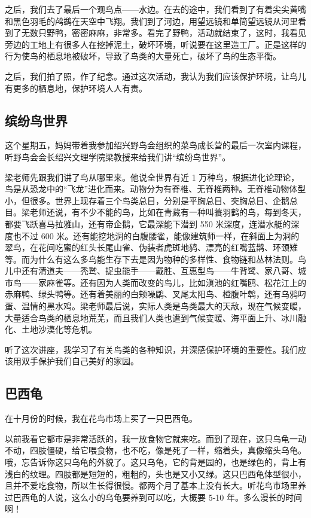 \documentclass[UTF8,a4paper,titlepage,twoside,10.5pt]{article}
\begin{document}
之后，我们去了最后一个观鸟点——水边。在去的途中，我们看到了有着尖尖黄嘴和黑色羽毛的鸬鹚在天空中飞翔。我们到了河边，用望远镜和单筒望远镜从河里看到了无数只野鸭，密密麻麻，非常多。看完了野鸭，活动就结束了，这时，我看见旁边的工地上有很多人在挖掉泥土，破坏环境，听说要在这里造工厂。正是这样的行为使鸟的栖息地被破坏，导致了鸟类的大量死亡，破坏了鸟的生态平衡。

之后，我们拍了照，作了纪念。通过这次活动，我认为我们应该保护环境，让鸟儿有更多的栖息地，保护环境人人有责。

\subsection{缤纷鸟世界}
\label{sec:org7ec663f}

这个星期五，妈妈带着我参加绍兴野鸟会组织的菜鸟成长营的最后一次室内课程，听野鸟会会长绍兴文理学院梁教授来给我们讲“缤纷鸟世界”。

梁老师先跟我们讲了鸟从哪里来。他说全世界有近 1 万种鸟，根据进化论理论，鸟是从恐龙中的“飞龙”进化而来。动物分为有脊椎、无脊椎两种。无脊椎动物体型小，但很多。世界上现存着三个鸟类总目，分别是平胸总目、突胸总目、企鹅总目。梁老师还说，有不少不能的鸟，比如在青藏有一种叫蓑羽鹤的鸟，每到冬天，都要飞跃喜马拉雅山，还有帝企鹅，它最深能下潜到 550 米深度，连潜水艇的深度也不过 600 米。还有能挖地洞的白腹腰雀，能像建筑师一样，在斜面上为洞的翠鸟，在花间吃蜜的红头长尾山雀、伪装者虎斑地鸫、漂亮的红嘴蓝鹊、环颈雉等。而为什么有这么多鸟能生存下去是因为物种的多样性、食物链和丛林法则。鸟儿中还有清道夫——秃鹫、捉虫能手——戴胜、互惠型鸟——牛背鹭、家八哥、城市鸟——家麻雀等。还有因为人类而改变的鸟儿，比如滇池的红嘴鸥、松花江上的赤麻鸭、绿头鸭等。还有着美丽的白颊噪鹛、叉尾太阳鸟、橙腹叶鹎，还有乌鸦叼蛋、温情的黑水鸡。梁老师最后说，实际人类是鸟类最大的天敌，现在气候变暖，大量适合鸟类的栖息地荒芜，而且我们人类也遭到气候变暖、海平面上升、冰川融化、土地沙漠化等危机。

听了这次讲座，我学习了有关鸟类的各种知识，并深感保护环境的重要性。我们应该用双手保护我们自己美好的家园。

\subsection{巴西龟}
\label{sec:org2f6585c}

在十月份的时候，我在花鸟市场上买了一只巴西龟。

以前我看它都市是非常活跃的，我一放食物它就来吃。而到了现在，这只乌龟一动不动，四肢僵硬，给它喂食物，也不吃，像是死了一样，缩着头，真像缩头乌龟。哦，忘告诉你这只乌龟的外貌了。这只乌龟，它的背是园的，也是绿色的，背上有浅白的纹理。四肢都是短短的，粗粗的，头也是又小又绿。这只巴西龟体型很小，且并不爱吃食物，所以生长得很慢。都两个月了基本上没有长大。听花鸟市场里养过巴西龟的人说，这么小的乌龟要养到可以吃，大概要 5-10 年。多么漫长的时间啊！
\end{document}
